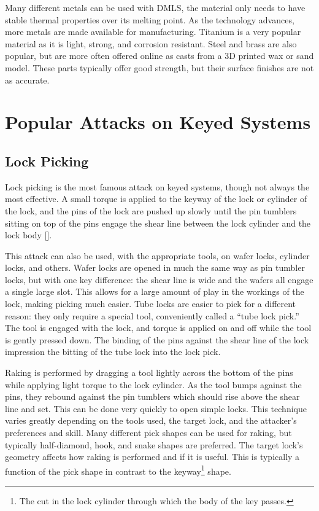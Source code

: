 \documentclass{acm_proc_article-sp}
\begin{document}
Many different metals can be used with DMLS, the material only needs to have stable thermal properties over its melting point. As the technology advances, more metals are made available for manufacturing. Titanium is a very popular material as it is light, strong, and corrosion resistant. Steel and brass are also popular, but are more often offered online as casts from a 3D printed wax or sand model. These parts typically offer good strength, but their surface finishes are not as accurate.

\section{Popular Attacks on Keyed Systems}
\subsection{Lock Picking}
Lock picking is the most famous attack on keyed systems, though not always the most effective. A small torque is applied to the keyway of the lock or cylinder of the lock, and the pins of the lock are pushed up slowly until the pin tumblers sitting on top of the pins engage the shear line between the lock cylinder and the lock body [\citealt{TOOOL1}].

This attack can also be used, with the appropriate tools, on wafer locks, cylinder locks, and others. Wafer locks are opened in much the same way as pin tumbler locks, but with one key difference: the shear line is wide and the wafers all engage a single large slot. This allows for a large amount of play in the workings of the lock, making picking much easier. Tube locks are easier to pick for a different reason: they only require a special tool, conveniently called a ``tube lock pick.'' The tool is engaged with the lock, and torque is applied on and off while the tool is gently pressed down. The binding of the pins against the shear line of the lock impression the bitting of the tube lock into the lock pick.

Raking is performed by dragging a tool lightly across the bottom of the pins while applying light torque to the lock cylinder. As the tool bumps against the pins, they rebound against the pin tumblers which should rise above the shear line and set. This can be done very quickly to open simple locks. This technique varies greatly depending on the tools used, the target lock, and the attacker's preferences and skill. Many different pick shapes can be used for raking, but typically half-diamond, hook, and snake shapes are preferred. The target lock's geometry affects how raking is performed and if it is useful. This is typically a function of the pick shape in contrast to the keyway\footnote{The cut in the lock cylinder through which the body of the key passes.} shape.
\end{document}
